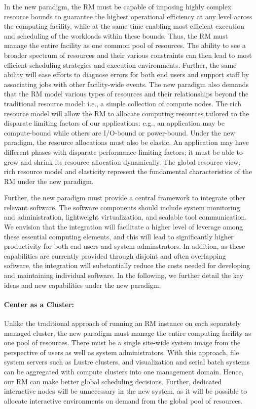 \documentclass{article}
\begin{document}
In the new paradigm, the RM must be capable of imposing highly complex resource bounds
to guarantee the highest operational efficiency at any level
across the computing facility, while at the same time enabling most efficient execution
and scheduling of the workloads within these bounds.
Thus, the RM must manage the entire facility as one
common pool of resources. The ability to see a broader spectrum of resources 
and their various constraints can then lead to most efficient scheduling strategies
and execution environments. Further, the same ability will ease 
efforts to diagnose errors for both end users and support staff
by associating jobs with other facility-wide events. 
The new paradigm also demands that the RM model
various types of resources and their relationships beyond the traditional resource model:
i.e., a simple collection of compute nodes.
The rich resource model will allow the RM to allocate computing resources
tailored to the disparate limiting factors of our applications: e.g.,
an application may be compute-bound while others are I/O-bound or power-bound.
Under the new paradigm, the resource allocations must also be elastic. 
An application may have different phases with disparate performance-limiting factors;
it must be able to grow and shrink its resource allocation dynamically. 
The global resource view, rich resource model and elasticity represent
the fundamental characteristics of the RM under the new paradigm.

Further, the new paradigm must provide a central framework to integrate
other relevant software. The software components should include   
system monitoring and administration, lightweight virtualization, 
and scalable tool communication. We envision that the integration will 
facilitate a higher level of leverage among these essential computing elements, 
and this will lead to significantly higher productivity 
for both end users and system adminstrators.  
In addition, as these capabilities are currently provided through disjoint
and often overlapping software, the integration will substantially reduce
the costs needed for developing and maintaining individual software.  
In the following, we further detail the key ideas and new capabilities 
under the new paradigm.


\paragraph{Center as a Cluster:}
Unlike the traditional approach of running an RM instance on each separately
managed cluster, 
the new paradigm must manage the
entire computing facility as one pool of resources. There must be a single site-wide 
system image from the perspective of users as well as system administrators.
With this approach, file system servers such as Lustre clusters, 
and visualization and serial batch systems can be aggregated
with compute clusters into one management domain. Hence,
our RM can make better global scheduling decisions. 
Further, dedicated interactive nodes will be unnecessary in the new system, as it
will be possible to allocate interactive environments on demand from the
global pool of resources.
\end{document}
